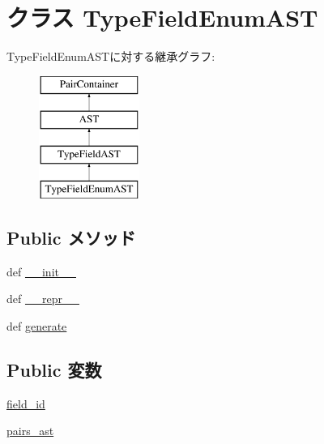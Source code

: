 \hypertarget{classslicc_1_1ast_1_1TypeFieldEnumAST_1_1TypeFieldEnumAST}{
\section{クラス TypeFieldEnumAST}
\label{classslicc_1_1ast_1_1TypeFieldEnumAST_1_1TypeFieldEnumAST}
}
TypeFieldEnumASTに対する継承グラフ:\begin{figure}[H]
\begin{center}
\leavevmode
\includegraphics[height=4cm]{classslicc_1_1ast_1_1TypeFieldEnumAST_1_1TypeFieldEnumAST}
\end{center}
\end{figure}
\subsection*{Public メソッド}
\begin{DoxyCompactItemize}
\item 
def \hyperlink{classslicc_1_1ast_1_1TypeFieldEnumAST_1_1TypeFieldEnumAST_ac775ee34451fdfa742b318538164070e}{\_\-\_\-init\_\-\_\-}
\item 
def \hyperlink{classslicc_1_1ast_1_1TypeFieldEnumAST_1_1TypeFieldEnumAST_ad8b9328939df072e4740cd9a63189744}{\_\-\_\-repr\_\-\_\-}
\item 
def \hyperlink{classslicc_1_1ast_1_1TypeFieldEnumAST_1_1TypeFieldEnumAST_a4555d1cee0dccf3942ea35fe86de2e8e}{generate}
\end{DoxyCompactItemize}
\subsection*{Public 変数}
\begin{DoxyCompactItemize}
\item 
\hyperlink{classslicc_1_1ast_1_1TypeFieldEnumAST_1_1TypeFieldEnumAST_a34ced61a2f2477f2d7a1279dac84ae9b}{field\_\-id}
\item 
\hyperlink{classslicc_1_1ast_1_1TypeFieldEnumAST_1_1TypeFieldEnumAST_a03baf6f181cc885912d671c3fcbfd7e3}{pairs\_\-ast}
\end{DoxyCompactItemize}


